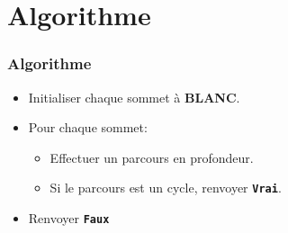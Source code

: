 \documentclass[svgnames,11pt]{beamer}
\begin{document}
\section{Algorithme}
\begin{frame}
    \frametitle{Algorithme}

    \begin{center}
        \begin{framed}
            \begin{itemize}
            \item Initialiser chaque sommet à \textbf{BLANC}.
            \item Pour chaque sommet:
                  \begin{itemize}
                      \item Effectuer un parcours en profondeur.
                      \item Si le parcours est un cycle, renvoyer \textbf{\texttt{Vrai}}.
                  \end{itemize}
            \item Renvoyer \textbf{\texttt{Faux}}
        \end{itemize}
        \end{framed}
    \end{center}

\end{frame}
\end{document}
